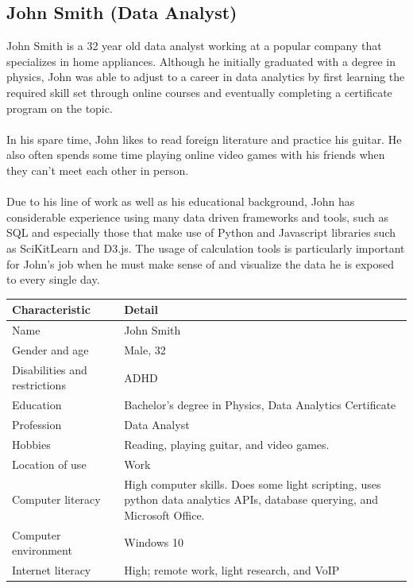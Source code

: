 \documentclass[11pt,onside]{report}
\begin{document}
\subsection{John Smith (Data Analyst)}
\begin{description}
John Smith is a 32 year old data analyst working at a popular company that specializes in home appliances. Although he initially graduated with a degree in physics, John was able to adjust to a career in data analytics by first learning the required skill set through online courses and eventually completing a certificate program on the topic. \\ \\

In his spare time, John likes to read foreign literature and practice his guitar. He also often spends some time playing online video games with his friends when they can’t meet each other in person.  \\ \\

Due to his line of work as well as his educational background, John has considerable experience using many data driven frameworks and tools, such as SQL and especially those that make use of Python and Javascript libraries such as SciKitLearn and D3.js. The usage of calculation tools is particularly important for John’s job when he must make sense of and visualize the data he is exposed to every single day.
\end{description}
\begin{center}
    \begin{tabular}{|p{4cm}|p{10cm}|}
        \hline
        \bf{Characteristic} & \bf{Detail} \\
        \hline
        Name &   John Smith \\
        \hline
        Gender and age & Male, 32 \\
        \hline
        Disabilities and restrictions & ADHD \\
        \hline
        Education & Bachelor’s degree in Physics, Data Analytics Certificate \\
        \hline
        Profession & Data Analyst \\
        \hline
        Hobbies & Reading, playing guitar, and video games. \\
        \hline
        Location of use & Work \\
        \hline
        Computer literacy & High computer skills. Does some light scripting, uses python data analytics APIs, database querying, and Microsoft Office. \\
        \hline
        Computer environment &  Windows 10 \\
        \hline
        Internet literacy &  High; remote work, light research, and VoIP \\
        \hline
    \end{tabular}
\end{center}
\end{document}
